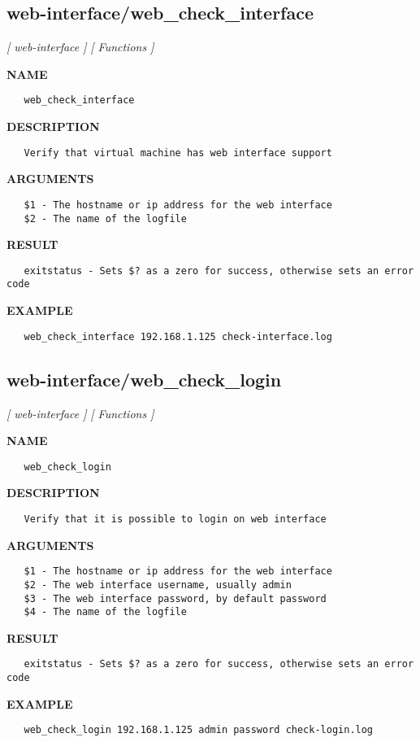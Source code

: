 \subsection{web-interface/web\_check\_interface}
\textsl{[ web-interface ]}
\textsl{[ Functions ]}

\label{ch:robo74}
\label{ch:web_interface_web_check_interface}
\textbf{NAME}
\begin{verbatim}
   web_check_interface
\end{verbatim}
\textbf{DESCRIPTION}
\begin{verbatim}
   Verify that virtual machine has web interface support
\end{verbatim}
\textbf{ARGUMENTS}
\begin{verbatim}
   $1 - The hostname or ip address for the web interface
   $2 - The name of the logfile
\end{verbatim}
\textbf{RESULT}
\begin{verbatim}
   exitstatus - Sets $? as a zero for success, otherwise sets an error code
\end{verbatim}
\textbf{EXAMPLE}
\begin{verbatim}
   web_check_interface 192.168.1.125 check-interface.log
\end{verbatim}
\newpage
\subsection{web-interface/web\_check\_login}
\textsl{[ web-interface ]}
\textsl{[ Functions ]}

\label{ch:robo75}
\label{ch:web_interface_web_check_login}
\textbf{NAME}
\begin{verbatim}
   web_check_login
\end{verbatim}
\textbf{DESCRIPTION}
\begin{verbatim}
   Verify that it is possible to login on web interface
\end{verbatim}
\textbf{ARGUMENTS}
\begin{verbatim}
   $1 - The hostname or ip address for the web interface
   $2 - The web interface username, usually admin
   $3 - The web interface password, by default password
   $4 - The name of the logfile
\end{verbatim}
\textbf{RESULT}
\begin{verbatim}
   exitstatus - Sets $? as a zero for success, otherwise sets an error code
\end{verbatim}
\textbf{EXAMPLE}
\begin{verbatim}
   web_check_login 192.168.1.125 admin password check-login.log
\end{verbatim}
\newpage
